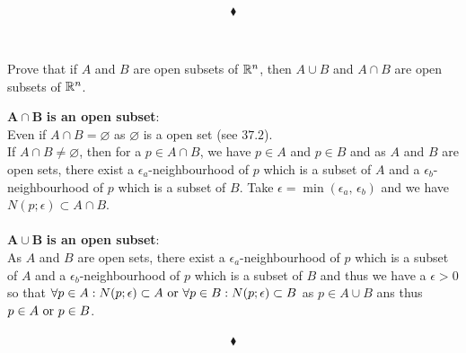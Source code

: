 $$\blacklozenge$$\\


\subsection{}
\begin{tcolorbox}
Prove that if $A$ and $B$ are open subsets of $\mathbb{R}^{n}$, then $A\cup B$ and $A\cap B$ are open subsets of $\mathbb{R}^n$.
\end{tcolorbox}
$\mathbf{A\cap B}$ \textbf{is an open subset}:\\
 Even if $A\cap B=\varnothing$ as $\varnothing$ is a open set (see $\mathbf{37.2}$).\\
If  $A\cap B\neq\varnothing$,  then for a $p\in  A\cap B$, we have   $p\in A$ and $p\in B$ and as $A$ and $B$ are open sets, there exist a $\epsilon_a$-neighbourhood of $p$ which is a subset of $A$ and a $\epsilon_b$-neighbourhood of $p$ which is a subset of $B$. Take $\epsilon = \min (\epsilon_a,\, \epsilon_b)$ and we have $N(p;\epsilon)\subset A\cap B$.\\\\
$\mathbf{A\cup B}$ \textbf{is an open subset}:\\
As $A$ and $B$ are open sets, there exist a $\epsilon_a$-neighbourhood of $p$ which is a subset of $A$ and a $\epsilon_b$-neighbourhood of $p$ which is a subset of $B$ and thus we have a $\epsilon>0$ so that $\forall p\in A: N(p;\epsilon)\subset A \text{ or } \forall p\in B: N(p;\epsilon)\subset B$ as $p\in A\cup B$ ans thus $p\in A\text{ or } p\in B$.\\\\

$$\blacklozenge$$


